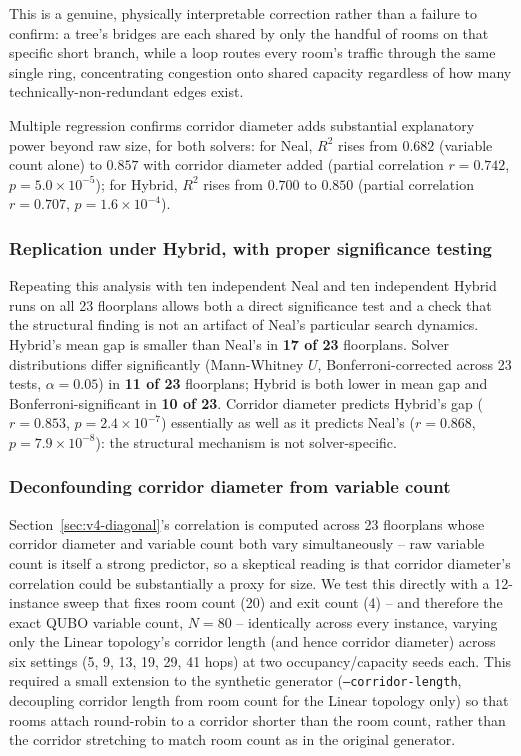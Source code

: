 \documentclass[11pt]{article}
\begin{document}
This is a genuine, physically interpretable correction rather than a failure to confirm: a tree's bridges are each shared by only the handful of rooms on that specific short branch, while a loop routes every room's traffic through the same single ring, concentrating congestion onto shared capacity regardless of how many technically-non-redundant edges exist.

Multiple regression confirms corridor diameter adds substantial explanatory power beyond raw size, for both solvers: for Neal, $R^2$ rises from $0.682$ (variable count alone) to $0.857$ with corridor diameter added (partial correlation $r=0.742$, $p=5.0\times10^{-5}$); for Hybrid, $R^2$ rises from $0.700$ to $0.850$ (partial correlation $r=0.707$, $p=1.6\times10^{-4}$).

\subsubsection{Replication under Hybrid, with proper significance testing}
Repeating this analysis with ten independent Neal and ten independent Hybrid runs on all 23 floorplans allows both a direct significance test and a check that the structural finding is not an artifact of Neal's particular search dynamics. Hybrid's mean gap is smaller than Neal's in \textbf{17 of 23} floorplans. Solver distributions differ significantly (Mann-Whitney $U$, Bonferroni-corrected across 23 tests, $\alpha=0.05$) in \textbf{11 of 23} floorplans; Hybrid is both lower in mean gap and Bonferroni-significant in \textbf{10 of 23}. Corridor diameter predicts Hybrid's gap ($r=0.853$, $p=2.4\times10^{-7}$) essentially as well as it predicts Neal's ($r=0.868$, $p=7.9\times10^{-8}$): the structural mechanism is not solver-specific.

\subsubsection{Deconfounding corridor diameter from variable count}
\label{sec:dsweep}

Section~\ref{sec:v4-diagonal}'s correlation is computed across 23 floorplans whose corridor diameter and variable count both vary simultaneously -- raw variable count is itself a strong predictor, so a skeptical reading is that corridor diameter's correlation could be substantially a proxy for size. We test this directly with a 12-instance sweep that fixes room count (20) and exit count (4) -- and therefore the exact QUBO variable count, $N=80$ -- identically across every instance, varying only the Linear topology's corridor length (and hence corridor diameter) across six settings (5, 9, 13, 19, 29, 41 hops) at two occupancy/capacity seeds each. This required a small extension to the synthetic generator (\texttt{--corridor-length}, decoupling corridor length from room count for the Linear topology only) so that rooms attach round-robin to a corridor shorter than the room count, rather than the corridor stretching to match room count as in the original generator.
\end{document}
